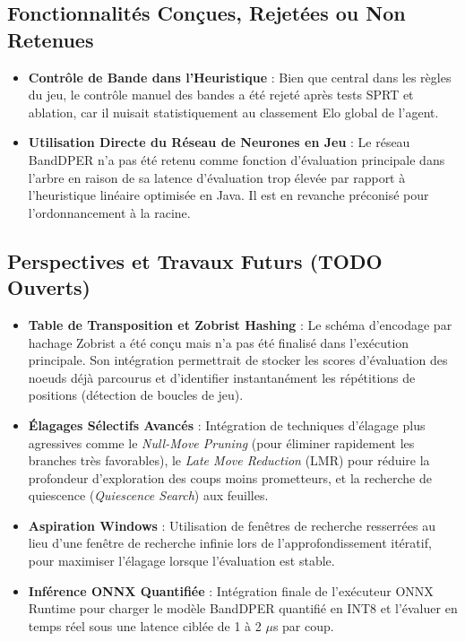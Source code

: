 \documentclass[12pt,a4paper]{article}
\begin{document}
\subsection{Fonctionnalités Conçues, Rejetées ou Non Retenues}
\begin{itemize}
    \item \textbf{Contrôle de Bande dans l'Heuristique} : Bien que central dans les règles du jeu, le contrôle manuel des bandes a été rejeté après tests SPRT et ablation, car il nuisait statistiquement au classement Elo global de l'agent.
    \item \textbf{Utilisation Directe du Réseau de Neurones en Jeu} : Le réseau BandDPER n'a pas été retenu comme fonction d'évaluation principale dans l'arbre en raison de sa latence d'évaluation trop élevée par rapport à l'heuristique linéaire optimisée en Java. Il est en revanche préconisé pour l'ordonnancement à la racine.
\end{itemize}


\subsection{Perspectives et Travaux Futurs (TODO Ouverts)}
\begin{itemize}
    \item \textbf{Table de Transposition et Zobrist Hashing} : Le schéma d'encodage par hachage Zobrist a été conçu mais n'a pas été finalisé dans l'exécution principale. Son intégration permettrait de stocker les scores d'évaluation des noeuds déjà parcourus et d'identifier instantanément les répétitions de positions (détection de boucles de jeu).
    \item \textbf{Élagages Sélectifs Avancés} : Intégration de techniques d'élagage plus agressives comme le \textit{Null-Move Pruning} (pour éliminer rapidement les branches très favorables), le \textit{Late Move Reduction} (LMR) pour réduire la profondeur d'exploration des coups moins prometteurs, et la recherche de quiescence (\textit{Quiescence Search}) aux feuilles.
    \item \textbf{Aspiration Windows} : Utilisation de fenêtres de recherche resserrées au lieu d'une fenêtre de recherche infinie lors de l'approfondissement itératif, pour maximiser l'élagage lorsque l'évaluation est stable.
    \item \textbf{Inférence ONNX Quantifiée} : Intégration finale de l'exécuteur ONNX Runtime pour charger le modèle BandDPER quantifié en INT8 et l'évaluer en temps réel sous une latence ciblée de 1 à 2 $\mu$s par coup.
\end{itemize}
\end{document}
